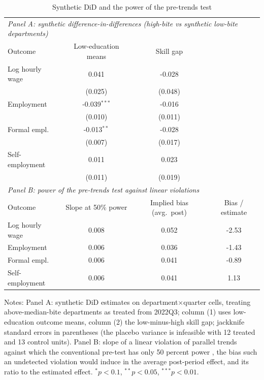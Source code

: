 \begin{table}[H]\centering
\caption{Synthetic DiD and the power of the pre-trends test}\label{tab:sdidpower}
\begin{threeparttable}
\footnotesize
\begin{tabular}{lccc}
\toprule
\multicolumn{4}{l}{\emph{Panel A: synthetic difference-in-differences (high-bite vs synthetic low-bite departments)}}\\
Outcome & Low-education means & Skill gap & \\
\midrule
Log hourly wage & 0.041 & -0.028 & \\
 & (0.025) & (0.048) & \\
Employment & -0.039$^{***}$ & -0.016 & \\
 & (0.010) & (0.011) & \\
Formal empl. & -0.013$^{**}$ & -0.028 & \\
 & (0.007) & (0.017) & \\
Self-employment & 0.011 & 0.023 & \\
 & (0.011) & (0.019) & \\
\midrule
\multicolumn{4}{l}{\emph{Panel B: power of the pre-trends test against linear violations \citep{roth_2022_pretest}}}\\
Outcome & Slope at 50\% power & Implied bias (avg.\ post) & Bias / estimate \\ \midrule
Log hourly wage & 0.008 & 0.052 & -2.53 \\
Employment & 0.006 & 0.036 & -1.43 \\
Formal empl. & 0.006 & 0.041 & -0.89 \\
Self-employment & 0.006 & 0.041 & 1.13 \\
\bottomrule
\end{tabular}
\begin{tablenotes}\footnotesize
\item Notes: Panel A: synthetic DiD estimates \citep{arkhangelsky_2021_sdid} on department$\times$quarter cells, treating above-median-bite departments as treated from 2022Q3; column (1) uses low-education outcome means, column (2) the low-minus-high skill gap; jackknife standard errors in parentheses (the placebo variance is infeasible with 12 treated and 13 control units). Panel B: slope of a linear violation of parallel trends against which the conventional pre-test has only 50 percent power \citep{roth_2022_pretest}, the bias such an undetected violation would induce in the average post-period effect, and its ratio to the estimated effect. $^{*}p<0.1$, $^{**}p<0.05$, $^{***}p<0.01$.
\end{tablenotes}
\end{threeparttable}\end{table}
